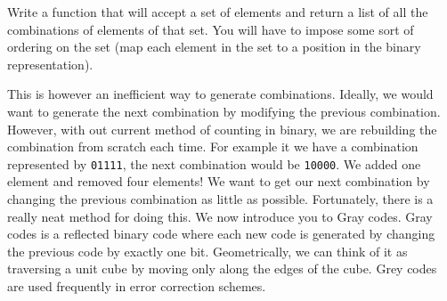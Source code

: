 \begin{problem}
Write a function that will accept a set of elements and return a list of all the combinations
of elements of that set.  You will have to impose some sort of ordering on the set (map each element
in the set to a position in the binary representation).
\end{problem}

This is however an inefficient way to generate combinations.  Ideally, we would want
to generate the next combination by modifying the previous combination.  However, with
out current method of counting in binary, we are rebuilding the combination from scratch
each time.  For example it we have a combination represented by \texttt{01111}, the next
combination would be \texttt{10000}.  We added one element and removed four elements!
We want to get our next combination by changing the previous combination as little as possible.
Fortunately, there is a really neat method for doing this.  We now introduce you to
Gray codes.  Gray codes is a reflected binary code where each new code is generated by
changing the previous code by exactly one bit.  Geometrically, we can think of it as
traversing a unit cube by moving only along the edges of the cube.  Grey codes are used frequently
in error correction schemes.

